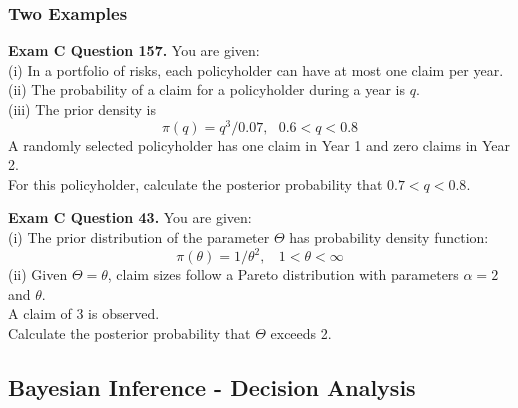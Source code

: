 \documentclass[]{book}
\begin{document}
\subsubsection{Two Examples}\label{two-examples}

\textbf{Exam C Question 157.} You are given:\\
(i) In a portfolio of risks, each policyholder can have at most one
claim per year.\\
(ii) The probability of a claim for a policyholder during a year is
\(q\).\\
(iii) The prior density is \[\pi(q) = q^3/0.07, \ \ \ 0.6 < q < 0.8\] A
randomly selected policyholder has one claim in Year 1 and zero claims
in Year 2.\\
For this policyholder, calculate the posterior probability that
\(0.7 < q < 0.8\).

\textbf{Exam C Question 43.} You are given:\\
(i) The prior distribution of the parameter \(\Theta\) has probability
density function:
\[\pi(\theta) = 1/\theta^2, \ \ \ \ 1 < \theta < \infty\] (ii) Given
\(\Theta = \theta\), claim sizes follow a Pareto distribution with
parameters \(\alpha=2\) and \(\theta\).\\
A claim of 3 is observed.\\
Calculate the posterior probability that \(\Theta\) exceeds 2.

\subsection{Bayesian Inference - Decision
Analysis}\label{bayesian-inference---decision-analysis}
\end{document}
